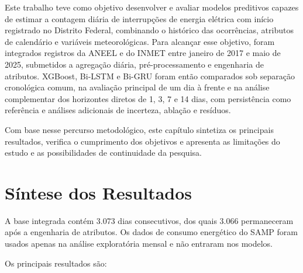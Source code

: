 Este trabalho teve como objetivo desenvolver e avaliar modelos preditivos capazes de estimar a contagem diária de interrupções de energia elétrica com início registrado no Distrito Federal, combinando o histórico das ocorrências, atributos de calendário e variáveis meteorológicas. Para alcançar esse objetivo, foram integrados registros da ANEEL e do INMET entre janeiro de 2017 e maio de 2025, submetidos a agregação diária, pré-processamento e engenharia de atributos. XGBoost, Bi-LSTM e Bi-GRU foram então comparados sob separação cronológica comum, na avaliação principal de um dia à frente e na análise complementar dos horizontes diretos de 1, 3, 7 e 14 dias, com persistência como referência e análises adicionais de incerteza, ablação e resíduos.

Com base nesse percurso metodológico, este capítulo sintetiza os principais resultados, verifica o cumprimento dos objetivos e apresenta as limitações do estudo e as possibilidades de continuidade da pesquisa.

\section{Síntese dos Resultados}

A base integrada contém 3.073 dias consecutivos, dos quais 3.066 permaneceram após a engenharia de atributos. Os dados de consumo energético do SAMP foram usados apenas na análise exploratória mensal e não entraram nos modelos.

Os principais resultados são:

